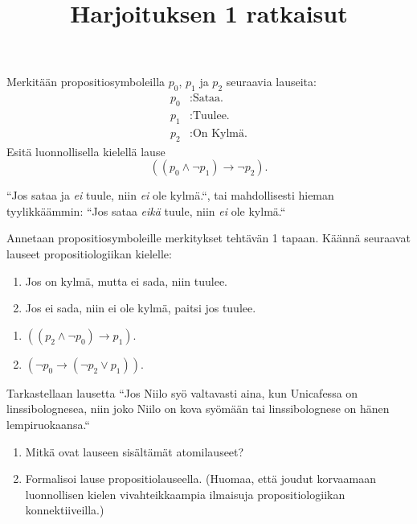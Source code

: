 \documentclass[12pt,a4paper]{article}
\title{Harjoituksen 1 ratkaisut}
\author{}
\date{}
\begin{document}
\maketitle

\noindent

\begin{exercise}
  Merkitään propositiosymboleilla \(p_0\), \(p_1\) ja \(p_2\) seuraavia
  lauseita:
  \begin{align*}
    p_0&: \text{Sataa.} \\
    p_1&: \text{Tuulee.} \\
    p_2&: \text{On Kylmä.}
  \end{align*}
  Esitä luonnollisella kielellä lause
  \[\left((p_0 \land \neg p_1) \rightarrow \neg p_2\right).\]
\end{exercise}

\begin{solution}
  ``Jos sataa ja \emph{ei} tuule, niin \emph{ei} ole kylmä.``, tai mahdollisesti
  hieman tyylikkäämmin: ``Jos sataa \emph{eikä} tuule, niin \emph{ei}
  ole kylmä.``
\end{solution}

\begin{exercise}
  Annetaan propositiosymboleille merkitykset tehtävän 1 tapaan. Käännä
  seuraavat lauseet propositiologiikan kielelle:
\begin{enumerate}[label=\alph*), nosep]
  \item Jos on kylmä, mutta ei sada, niin tuulee.
  \item Jos ei sada, niin ei ole kylmä, paitsi jos tuulee.
\end{enumerate}
\end{exercise}

\begin{solution}
\leavevmode\par
\begin{enumerate}[label=\alph*), nosep]
\item \(((p_2 \land \neg p_0) \rightarrow p_1).\)
\item \((\neg p_0 \rightarrow (\neg p_2 \lor p_1)).\)
\end{enumerate}
\end{solution}

\begin{exercise}
Tarkastellaan lausetta ``Jos Niilo syö valtavasti aina, kun Unicafessa
on linssibolognesea, niin joko Niilo on kova syömään tai linssibolognese on
hänen lempiruokaansa.``
\begin{enumerate}[label=\alph*), nosep]
\item Mitkä ovat lauseen sisältämät atomilauseet?
\item Formalisoi lause propositiolauseella. (Huomaa, että joudut korvaamaan
  luonnollisen kielen vivahteikkaampia ilmaisuja propositiologiikan
konnektiiveilla.)
\end{enumerate}
\end{exercise}
\end{document}

